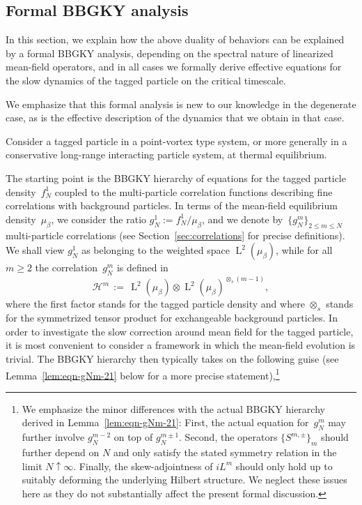 \documentclass[a4paper,11pt,reqno,noindent]{amsart}
\theoremstyle{plain}
\numberwithin{equation}{section}
\newcommand{\Hc}{\mathcal H}
\newcommand{\3}{|\!|\!|}
\newcommand{\Ld}{\operatorname{L}}
\begin{document}
\subsection{Formal BBGKY analysis}\label{sec:formal}
In this section, we explain how the above duality of behaviors can be explained by a formal BBGKY analysis, depending on the spectral nature of linearized mean-field operators, and in all cases we formally derive effective equations for the slow dynamics of the tagged particle on the critical timescale. {We emphasize that this formal analysis is new to our knowledge in the degenerate case, as is the effective description of the dynamics that we obtain in that case.

Consider a tagged particle in a point-vortex type system, or more generally in a conservative long-range interacting particle system, at thermal equilibrium.}
The starting point is the BBGKY hierarchy of equations for the tagged particle density~$f_N^1$ coupled to the  multi-particle correlation functions describing fine correlations with background particles.
In terms of the mean-field equilibrium density~$\mu_\beta$, we consider the ratio $g_N^1:=f_N^1/\mu_\beta$, and we denote by~$\{g_N^m\}_{2\le m\le N}$ multi-particle correlations (see Section~\ref{sec:correlations} for precise definitions).
We shall view $g_N^1$ as belonging to the weighted space $\Ld^2(\mu_\beta)$, while for all $m\ge2$ the correlation~$g_N^m$ is defined in
\[\Hc^m\,:=\,\Ld^2(\mu_\beta)\otimes\Ld^2(\mu_\beta)^{\otimes_s (m-1)},\]
where the first factor stands for the tagged particle density and where $\otimes_s$ stands for the symmetrized tensor product for exchangeable background particles.
{In order to investigate the slow correction around mean field for the tagged particle, it is most convenient to consider a framework in which the mean-field evolution is trivial.}
The BBGKY hierarchy then typically takes on the following guise (see Lemma~\ref{lem:eqn-gNm-21} below for a more precise statement),\footnote{We emphasize the minor differences with the actual BBGKY hierarchy derived in Lemma~\ref{lem:eqn-gNm-21}: First, the actual equation for~$g_N^m$ may further involve $g_N^{m-2}$ on top of $g_N^{m\pm1}$. Second, the operators $\{S^{m,\pm}\}_m$ should further depend on $N$ and only satisfy the stated symmetry relation in the limit $N\uparrow\infty$. Finally, the skew-adjointness of $iL^m$ should only hold up to suitably deforming the underlying Hilbert structure. We neglect these issues here as they do not substantially affect the present formal discussion.}
\end{document}
